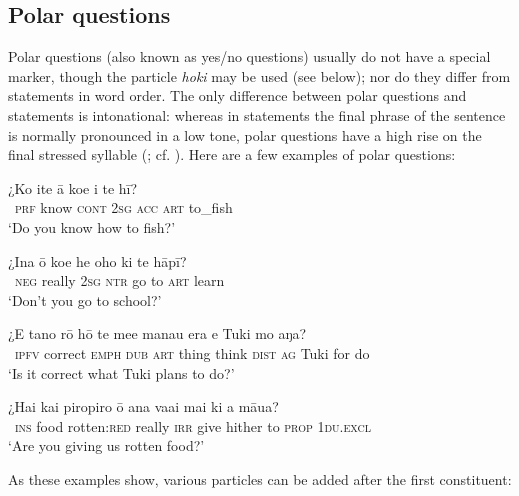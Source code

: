 \subsection{Polar questions}\label{sec:10.3.1}
Polar questions (also known as yes/no questions) usually do not have a special marker, though the particle \textit{hoki} may be used (see below); nor do they differ from statements in word order. The only difference between polar questions and statements is intonational: whereas in statements the final phrase of the sentence is normally pronounced in a low tone, polar questions have a high rise on the final stressed syllable (; cf. \citealt[27]{DuFeu1995}). Here are a few examples of polar questions:

\ea\label{ex:10.17}
\gll ¿Ko {\ꞌ}ite {\ꞌ}ā koe i te hī? \\
~\textsc{prf} know \textsc{cont} \textsc{2sg} \textsc{acc} \textsc{art} to\_fish \\

\glt 
‘Do you know how to fish?’ \textstyleExampleref{[R245.101]} 
\z

\ea\label{ex:10.18}
\gll ¿{\ꞌ}Ina {\ꞌ}ō koe he oho ki te hāpī? \\
~\textsc{neg} really \textsc{2sg} \textsc{ntr} go to \textsc{art} learn \\

\glt 
‘Don’t you go to school?’ \textstyleExampleref{[R245.086]} 
\z

\ea\label{ex:10.19}
\gll ¿E tano rō hō te me{\ꞌ}e mana{\ꞌ}u era e Tuki mo aŋa? \\
~\textsc{ipfv} correct \textsc{emph} \textsc{dub} \textsc{art} thing think \textsc{dist} \textsc{ag} Tuki for do \\

\glt 
‘Is it correct what Tuki plans to do?’ \textstyleExampleref{[R535.211]} 
\z

\ea\label{ex:10.20}
\gll ¿Hai kai piropiro {\ꞌ}ō ana va{\ꞌ}ai mai ki a māua? \\
~\textsc{ins} food rotten:\textsc{red} really \textsc{irr} give hither to \textsc{prop} \textsc{1du.excl} \\

\glt
‘Are you giving us rotten food?’ \textstyleExampleref{[R310.260]} 
\z

As these examples show, various particles can be added after the first constituent:

